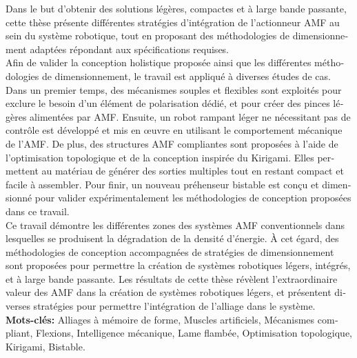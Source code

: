 \begin{otherlanguage}{french}
Dans le but d’obtenir des solutions légères, compactes et à large bande passante, cette thèse présente différentes stratégies d’intégration de l’actionneur AMF au sein du système robotique, tout en proposant des méthodologies de dimensionnement adaptées répondant aux spécifications requises.\\

Afin de valider la conception holistique proposée ainsi que les différentes méthodologies de dimensionnement, le travail est appliqué à diverses études de cas. Dans un premier temps, des mécanismes souples et flexibles sont exploités pour exclure le besoin d’un élément de polarisation dédié, et pour créer des pinces légères alimentées par AMF. Ensuite, un robot rampant léger ne nécessitant pas de contrôle est développé et mis en œuvre en utilisant le comportement mécanique de l’AMF. De plus, des structures AMF compliantes sont proposées à l’aide de l’optimisation topologique et de la conception inspirée du Kirigami. Elles permettent au matériau de générer des sorties multiples tout en restant compact et facile à assembler.
Pour finir, un nouveau préhenseur bistable est conçu et dimensionné pour valider expérimentalement les méthodologies de conception proposées dans ce travail.\\

Ce travail démontre les différentes zones des systèmes AMF conventionnels dans lesquelles se produisent la dégradation de la densité d'énergie. À cet égard, des méthodologies de conception accompagnées de stratégies de dimensionnement sont proposées pour permettre la création de systèmes robotiques légers, intégrés, et à large bande passante. Les résultats de cette thèse révèlent l'extraordinaire valeur des AMF dans la création de systèmes robotiques légers, et présentent diverses stratégies pour permettre l'intégration de l'alliage dans le système.\\

\textbf{Mots-clés:} Alliages à mémoire de forme, Muscles artificiels, Mécanismes compliant, Flexions, Intelligence mécanique, Lame flambée, Optimisation topologique, Kirigami, Bistable.
\end{otherlanguage}



